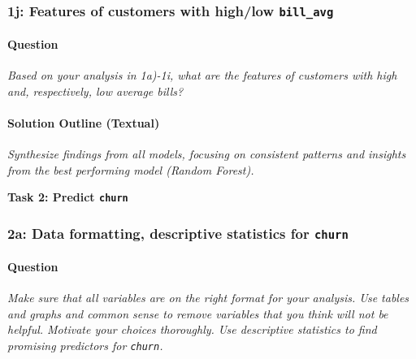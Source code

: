 \documentclass[12pt,a4paper]{article}
\newcommand{\Rcode}[1]{\texttt{#1}} %
\begin{document}
    \subsubsection{1j: Features of customers with high/low \Rcode{bill\_avg}}
        \paragraph{Question}
        \textit{Based on your analysis in 1a)-1i, what are the features of customers with high and, respectively, low average bills?}
        \paragraph{Solution Outline (Textual)}
        \textit{Synthesize findings from all models, focusing on consistent patterns and insights from the best performing model (Random Forest).}

\vspace{1em}
\textbf{\Large Task 2: Predict \Rcode{churn}}
\vspace{0.5em}

    \subsubsection{2a: Data formatting, descriptive statistics for \Rcode{churn}}
        \paragraph{Question}
        \textit{Make sure that all variables are on the right format for your analysis. Use tables and graphs and common sense to remove variables that you think will not be helpful. Motivate your choices thoroughly. Use descriptive statistics to find promising predictors for \Rcode{churn}.}
\end{document}
